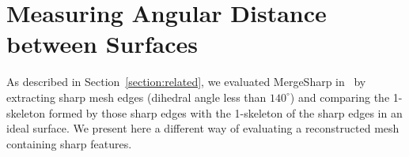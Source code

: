 
\section{Measuring Angular Distance between Surfaces}
\label{section:angular_distance}

As described in Section~\ref{section:related},
we evaluated MergeSharp in~\cite{bw-cisec-13}
by extracting sharp mesh edges (dihedral angle less than $140^\circ$)
and comparing the 1-skeleton formed
by those sharp edges with the 1-skeleton of the sharp edges 
in an ideal surface.
We present here a different way of evaluating 
a reconstructed mesh containing sharp features.








